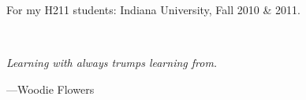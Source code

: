 
\begin{center}

For my H211 students: Indiana University, Fall 2010 \& 2011.
\end{center}
\ \\
\begin{flushright}
\textit{Learning with always trumps learning from.}
\vspace{0.5cm}

---Woodie Flowers

\end{flushright}



